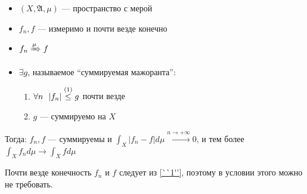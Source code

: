\begin{theorem}\itemfix
    \begin{itemize}
        \item \((X, \mathfrak{A}, \mu)\) --- пространство с мерой
        \item \(f_n, f\) --- измеримо и почти везде конечно
        \item \(f_n \xRightarrow{\mu} f\)
        \item \(\exists g\), называемое ``суммируемая мажоранта'':
              \begin{enumerate}
                  \item \(\forall n \ \ |f_n| \symref{``1''}{\leq} g\) почти везде
                  \item \(g\) --- суммируемо на \(X\)
              \end{enumerate}
    \end{itemize}

    Тогда: \(f_n, f\) --- суммируемы и \(\int_X |f_n - f| d\mu \xrightarrow{n \to +\infty} 0\), и тем более \(\int_X f_n d\mu \to \int_X f d\mu\)
\end{theorem}
\begin{remark}
    Почти везде конечность \(f_n\) и \(f\) следует из \eqref{``1''}, поэтому в условии этого можно не требовать.
\end{remark}
